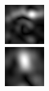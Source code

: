 \begin{figure}[ht]
\begin{center}
 \includegraphics[width=\columnwidth/9]{ch4/figures/mag_1_7.jpg}\\
 \includegraphics[width=\columnwidth/9]{ch4/figures/mag_2_0.jpg}

\end{center}
\end{figure}
